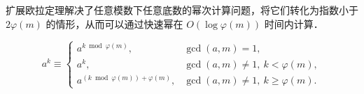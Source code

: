 扩展欧拉定理解决了任意模数下任意底数的幂次计算问题，将它们转化为指数小于 $2\varphi(m)$ 的情形，从而可以通过快速幂在 $O(\log\varphi(m))$ 时间内计算．

\[
a^k \equiv 
\begin{cases}
a^{k \bmod \varphi(m)}, & \gcd(a,m)=1, \\[4pt]
a^k, & \gcd(a,m) \neq 1,\ k < \varphi(m), \\[4pt]
a^{(k \bmod \varphi(m)) + \varphi(m)}, & \gcd(a,m) \neq 1,\ k \ge \varphi(m).
\end{cases}
\]